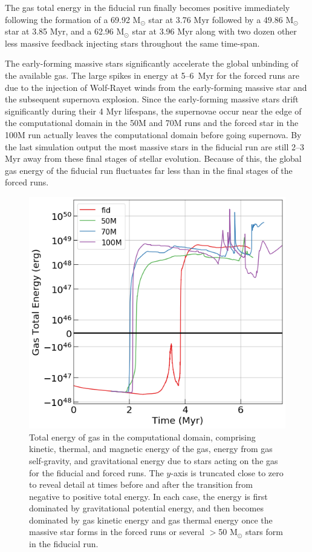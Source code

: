 \documentclass[twoside]{drexel-thesis}
\begin{document}
\begin{thesis}
The gas total energy in the fiducial run finally becomes positive immediately following the formation of a 69.92 M$_{\odot}$ star at 3.76 Myr followed by a 49.86 M$_{\odot}$ star at 3.85 Myr, and a 62.96 M$_{\odot}$ star at 3.96 Myr along with two dozen other less massive feedback injecting stars throughout the same time-span. 

The early-forming massive stars significantly accelerate the global unbinding of the available gas. The large spikes in energy at 5--6~Myr for the forced runs are due to the injection of Wolf-Rayet winds from the early-forming massive star and the subsequent supernova explosion. Since the early-forming massive stars drift significantly during their 4 Myr lifespans, the supernovae occur near the edge of the computational domain in the 50M and 70M runs and the forced star in the 100M run actually leaves the computational domain before going supernova. By the last simulation output the most massive stars in the fiducial run are still 2--3 Myr away from these final stages of stellar evolution. Because of this, the global gas energy of the fiducial run fluctuates far less than in the final stages of the forced runs. 

\begin{figure}[!htb]
	\includegraphics[width=\columnwidth]{gas_total_energy_091922.png}
    \caption{Total energy of gas in the computational domain, comprising kinetic, thermal, and magnetic energy of the gas,  energy from gas self-gravity, and gravitational energy due to stars acting on the gas for the fiducial and forced runs. The $y$-axis is truncated close to zero to reveal detail at times before and after the transition from negative to positive total energy. In each case, the energy is first dominated by gravitational potential energy, and then becomes dominated by gas kinetic energy and gas thermal energy once the massive star forms in the forced runs or several $>$50 M$_{\odot}$ stars form in the fiducial run.}
    \label{fig:gas_energy}
\end{figure}


\end{thesis}
\end{document}
